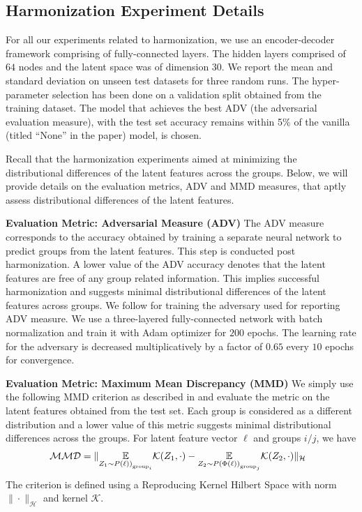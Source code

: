 \subsection{Harmonization Experiment Details}
For all our experiments related to harmonization, we use an encoder-decoder framework comprising of fully-connected layers. The hidden layers comprised of $64$ nodes and the latent space was of dimension $30$. We report the mean and standard deviation on unseen test datasets for three random runs. The hyper-parameter selection has been done on a validation split obtained from the training dataset. The model that achieves the best ADV (the adversarial evaluation measure), with the test set accuracy remains within 5\% of the vanilla (titled ``None'' in the paper) model, is chosen. 

Recall that the harmonization experiments aimed at minimizing the distributional differences of the latent features across the groups. Below, we will provide details on the evaluation metrics, ADV and MMD measures, that aptly assess distributional differences of the latent features. 

{\bf Evaluation Metric: Adversarial Measure (ADV)}
The ADV measure corresponds to the accuracy obtained by training a separate neural network to predict groups from the latent features. This step is conducted post harmonization. A lower value of the ADV accuracy denotes that the latent features are free of any group related information. This implies successful harmonization and suggests minimal distributional differences of the latent features across groups. We follow \citep{cai} for training the adversary used for reporting ADV measure. We use a three-layered fully-connected network with batch normalization and train it with Adam optimizer for $200$ epochs. The learning rate for the adversary is decreased multiplicatively by a factor of $0.65$ every $10$ epochs for convergence. 


{\bf Evaluation Metric: Maximum Mean Discrepancy (MMD)}
We simply use the following MMD criterion as described in \citep{gretton2006kernel} and evaluate the metric on the latent features obtained from the test set. Each group is considered as a different distribution and a lower value of this metric suggests minimal distributional differences across the groups. For latent feature vector $\ell$ and groups $i/j$, we have 
\begin{align}
\label{mmd_eq}
    \hspace{-0.1in} \mathcal{MMD} = \|\underset{Z_1\sim P\left(\ell)\right)_{\text{group}_i}}{\EE} \mathcal{K}(Z_1, \cdot) - \underset{Z_2\sim P\left(\Phi(\ell)\right)_{\text{group}_j}}{\EE} \mathcal{K}(Z_2, \cdot)\|_{\mathcal{H}}
\end{align}
The criterion is defined using a Reproducing Kernel Hilbert Space with norm $\|\cdot\|_{\mathcal{H}}$ and kernel $\mathcal{K}$. 